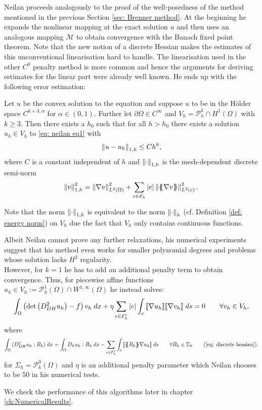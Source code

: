 Neilan proceeds analogously to the proof of the well-posedness of the method mentioned in the previous Section \ref{sec: Brenner method}. At the beginning he expands the nonlinear mapping at the exact solution $u$ and then uses an analogous mapping $\mathcal M$ to obtain convergence with the Banach fixed point theorem. Note that the new notion of a discrete Hessian makes the estimates of this unconventional linearisation hard to handle. The linearisation used in the other $C^0$ penalty method is more common and hence the arguments for deriving estimates for the linear part were already well known.
He ends up with the following error estimation:
\begin{theorem} \label{thm: error estimate Neilan}
	Let $u$ be the convex solution to the \MA equation and suppose $u$ to be in the Hölder space $C^{k+3,\alpha}$ for $\alpha \in (0,1)$. Further let $\partial \Omega \in C^\infty$ and $V_h = \mathcal P^k_h \cap H^1(\Omega)$ with $k\geq3$. Then there exists a $h_0$ such that for all $h > h_0$ there exists a solution $u_h \in V_h$ to \eqref{eq: neilan eq1} with
	\[
		\left\lVert u-u_h \right\rVert_{1,h} \leq C h^k, 
	\]
	where $C$ is a constant independent of $h$ and $\left\lVert \cdot  \right\rVert_{1,h}$ is the mesh-dependent discrete semi-norm 
	\[
		\left\lVert v \right\rVert_{1,h}^2 = \left\lVert \nabla v  \right\rVert^2_{L^2(\Omega)} + \sum_{e \in \mathcal{E}_h} |e| \left\lVert \{\!\!\{ \nabla v \}\!\!\} \right\rVert^2_{L^2(e)}.
	\]
\end{theorem}
Note that the norm $\left\lVert \cdot \right\rVert_{1,h}$ is equivalent to the norm $\left\lVert \cdot \right\rVert_{h}$ (cf. Definition \ref{def: energy norm}) on $V_h$ due the fact that $V_h$ only contains continuous functions.

Albeit Neilan cannot prove any further relaxations, his numerical experiments suggest that his method even works for smaller polynomial degrees and problems whose solution lacks $H^2$ regularity. 
\\However, for $k=1$ he has to add an additional penalty term to obtain convergence. Thus, for piecewise affine functions $u_h \in V_h :=\mathcal P_h^1(\Omega) \cap W^{1,\infty}(\Omega)$ he instead solves:
\begin{align}
		\int_{\Omega} {{ \left(\det{\left(D_{DH}^2 u_h\right)} - f \right) v_h}\;dx} 
			+ \eta \sum_{e \in \mathcal{E}_h^i} |e| \int_{e} {{ \llbracket  \nabla u_h \rrbracket \llbracket \nabla v_h \rrbracket}\;ds}
		= 0 \qquad \forall v_h \in V_h, \label{eq: neilan eq1 + jump}
\end{align}
where
	\begin{align*}
		\myIntX  \Omega { (D_{DH}^2 u_h : B_h) }
		= \myIntX  \Omega { D_h u_h: B_h}
			 -\sum_{ e \in \edgesi} \myIntS e {  \jump {\average {B_h} \nabla u_h }}\qquad \forall B_h \in \Sigma_h \tag{\ref{eq: discrete hessian}}.
	\end{align*}
for $\Sigma_h = \mathcal P^0_k(\Omega)$ and $\eta$ is an additional penalty parameter which Neilan chooses to be 50 in his numerical tests.

We check the performance of this algorithms later in chapter \ref{ch:NumericalResults}.

